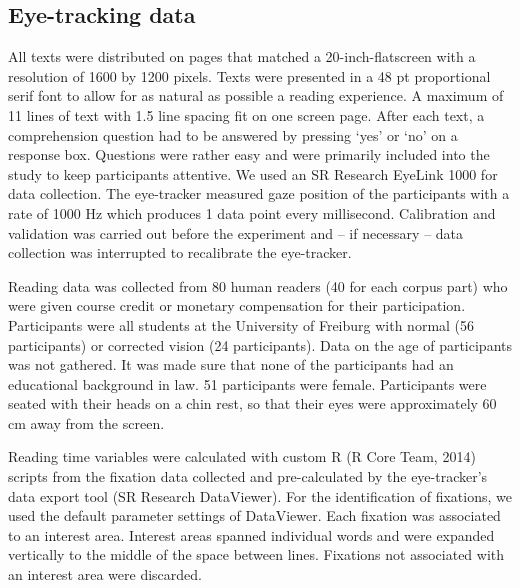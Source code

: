 \documentclass[output=paper]{langsci/langscibook}
\begin{document}
\subsection{\label{bkm:Ref283222793}Eye-tracking data}

All texts were distributed on pages that matched a 20-inch-flatscreen with a resolution of 1600 by 1200 pixels. Texts were presented in a 48 pt proportional serif font to allow for as natural as possible a reading experience. A maximum of 11 lines of text with 1.5 line spacing fit on one screen page. After each text, a comprehension question had to be answered by pressing ‘yes’ or ‘no’ on a response box. Questions were rather easy and were primarily included into the study to keep participants attentive. We used an SR Research EyeLink 1000 for data collection. The eye-tracker measured gaze position of the participants with a rate of 1000 Hz which produces 1 data point every millisecond. Calibration and validation was carried out before the experiment and – if necessary – data collection was interrupted to recalibrate the eye-tracker.

Reading data was collected from 80 human readers (40 for each corpus part) who were given course credit or monetary compensation for their participation. Participants were all students at the University of Freiburg with normal (56 participants) or corrected vision (24 participants). Data on the age of participants was not gathered. It was made sure that none of the participants had an educational background in law. 51 participants were female. Participants were seated with their heads on a chin rest, so that their eyes were approximately 60 cm away from the screen.

Reading time variables were calculated with custom R (R Core Team, 2014) scripts from the fixation data collected and pre-calculated by the eye-tracker’s data export tool (SR Research DataViewer). For the identification of fixations, we used the default parameter settings of DataViewer. Each fixation was associated to an interest area. Interest areas spanned individual words and were expanded vertically to the middle of the space between lines. Fixations not associated with an interest area were discarded.
\end{document}
